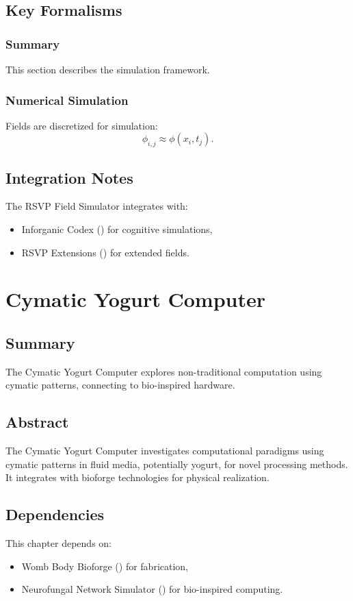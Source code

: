\documentclass[11pt,oneside]{memoir}
\theoremstyle{plain}
\begin{document}
\section{Key Formalisms}
\subsection{Summary}
This section describes the simulation framework.

\subsection{Numerical Simulation}
Fields are discretized for simulation:
\begin{equation}
    \phi_{i,j} \approx \phi(x_i, t_j).
\end{equation}

\section{Integration Notes}
The RSVP Field Simulator integrates with:
\begin{itemize}
    \item Inforganic Codex () for cognitive simulations,
    \item RSVP Extensions () for extended fields.
\end{itemize}

\chapter{Cymatic Yogurt Computer}
\label{sec:cymatic_yogurt}

\section{Summary}
The Cymatic Yogurt Computer explores non-traditional computation using cymatic patterns, connecting to bio-inspired hardware.

\section{Abstract}
The Cymatic Yogurt Computer investigates computational paradigms using cymatic patterns in fluid media, potentially yogurt, for novel processing methods. It integrates with bioforge technologies for physical realization.

\section{Dependencies}
This chapter depends on:
\begin{itemize}
    \item Womb Body Bioforge () for fabrication,
    \item Neurofungal Network Simulator () for bio-inspired computing.
\end{itemize}
\end{document}

